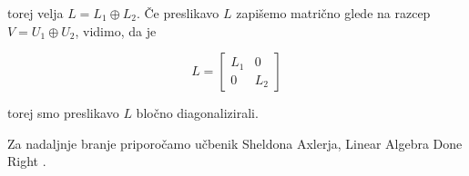 \documentclass[a4paper,12pt]{article}
\begin{document}
torej velja $L = L_1 \oplus L_2$.
Če preslikavo $L$ zapišemo matrično glede na razcep $V = U_1 \oplus U_2$, vidimo, da je

$$
L =
\begin{bmatrix}
    L_1 & 0 \\
    0 & L_2
\end{bmatrix}
$$

torej smo preslikavo $L$ bločno diagonalizirali.

Za nadaljnje branje priporočamo učbenik Sheldona Axlerja, Linear Algebra Done Right \cite{axler}.





\printindex
\end{document}
